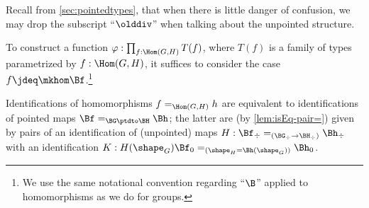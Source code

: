 Recall from \cref{sec:pointedtypes},
that when there is little danger of confusion, we may drop the subscript
``$\olddiv$'' when talking about the unpointed structure.

\begin{remark}\label{rem:Bf-convention}
  To construct a function $\varphi : \prod_{f:\Hom(G,H)}T(f)$,
  where $T(f)$ is a family of types parametrized by $f:\Hom(G,H)$,
  it suffices to consider the case $f \jdeq \mkhom\Bf$.\footnote{%
    We use the same notational convention regarding ``$\B$''
    applied to homomorphisms as we do for groups.}

  Identifications of homomorphisms $f=_{\Hom(G,H)}h$
  are equivalent to identifications of pointed maps
  $\Bf =_{\BG\ptdto\BH} \Bh$;
  the latter are (by \cref{lem:isEq-pair=}) given by
  pairs of an identification of (unpointed) maps
  $H : \Bf_\div =_{(\BG_\div \to \BH_\div)} \Bh_\div$ with an identification
  $K : H(\shape_G)\Bf_0 =_{(\shape_H=\Bh(\shape_G))} \Bh_0$.
\end{remark}

